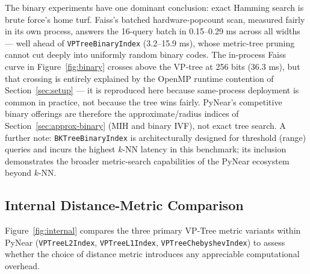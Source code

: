\documentclass[11pt,a4paper]{article}
\begin{document}
The binary experiments have one dominant conclusion: exact Hamming search
is brute force's home turf.  Faiss's batched hardware-popcount scan,
measured fairly in its own process, answers the 16-query batch in
0.15--0.29 ms across all widths — well ahead of
\texttt{VPTreeBinaryIndex} (3.2--15.9 ms), whose metric-tree pruning
cannot cut deeply into uniformly random binary codes.  The in-process
Faiss curve in Figure~\ref{fig:binary} crosses above the VP-tree at 256
bits (36.3 ms), but that crossing is entirely explained by the OpenMP
runtime contention of Section~\ref{sec:setup} — it is reproduced here
because same-process deployment is common in practice, not because the
tree wins fairly.  PyNear's competitive binary offerings are therefore
the approximate/radius indices of Section~\ref{sec:approx-binary} (MIH
and binary IVF), not exact tree search.  A further note:
\texttt{BKTreeBinaryIndex} is
architecturally designed for threshold (range) queries and incurs the
highest $k$-NN latency in this benchmark; its inclusion demonstrates the
broader metric-search capabilities of the PyNear ecosystem beyond $k$-NN.

\subsection{Internal Distance-Metric Comparison}
\label{sec:internal}

Figure~\ref{fig:internal} compares the three primary VP-Tree metric variants
within PyNear (\texttt{VPTreeL2Index}, \texttt{VPTreeL1Index},
\texttt{VPTreeChebyshevIndex}) to assess whether the choice of distance
metric introduces any appreciable computational overhead.
\end{document}
